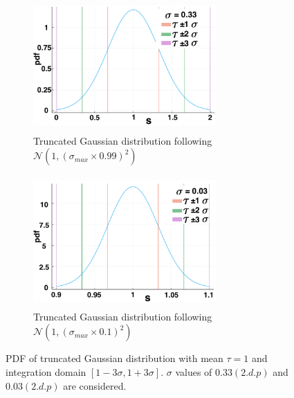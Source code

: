 \begin{figure}[H]
    \centering
    \begin{subfigure}[b]{0.45\textwidth}
        \centering
        \includegraphics[width=7cm,height=5cm]{t1sig1.png}
        \caption{Truncated Gaussian distribution following $\mathcal{N}(1,(\sigma_{max}\times0.99)^2)$}
        \label{}
    \end{subfigure}
    \hfill
    \begin{subfigure}[b]{0.45\textwidth}
        \centering
        \includegraphics[width=7cm,height=5cm]{t1sig2.png}
        \caption{Truncated Gaussian distribution following $\mathcal{N}(1,(\sigma_{max}\times0.1)^2)$}
        \label{}
    \end{subfigure}
\caption{PDF of truncated Gaussian distribution with mean $\tau=1$ and integration domain $[1-3\sigma,1+3\sigma]$. $\sigma$ values of $0.33(2.d.p)$ and $0.03(2.d.p)$ are considered.}
\label{fig:pdf1}
\end{figure}
